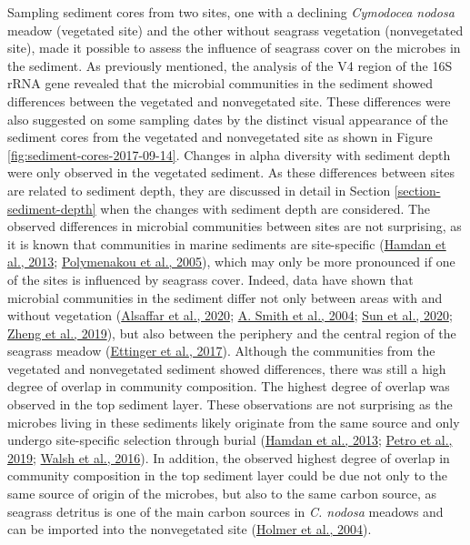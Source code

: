 \documentclass[
  12 pt,
]{book}
\begin{document}
Sampling sediment cores from two sites, one with a declining \emph{Cymodocea nodosa} meadow (vegetated site) and the other without seagrass vegetation (nonvegetated site), made it possible to assess the influence of seagrass cover on the microbes in the sediment. As previously mentioned, the analysis of the V4 region of the 16S rRNA gene revealed that the microbial communities in the sediment showed differences between the vegetated and nonvegetated site. These differences were also suggested on some sampling dates by the distinct visual appearance of the sediment cores from the vegetated and nonvegetated site as shown in Figure \ref{fig:sediment-cores-2017-09-14}. Changes in alpha diversity with sediment depth were only observed in the vegetated sediment. As these differences between sites are related to sediment depth, they are discussed in detail in Section \ref{section-sediment-depth} when the changes with sediment depth are considered. The observed differences in microbial communities between sites are not surprising, as it is known that communities in marine sediments are site-specific (\protect\hyperlink{ref-Hamdan2013}{Hamdan et al., 2013}; \protect\hyperlink{ref-Polymenakou2005}{Polymenakou et al., 2005}), which may only be more pronounced if one of the sites is influenced by seagrass cover. Indeed, data have shown that microbial communities in the sediment differ not only between areas with and without vegetation (\protect\hyperlink{ref-Alsaffar2020}{Alsaffar et al., 2020}; \protect\hyperlink{ref-Smith2004}{A. Smith et al., 2004}; \protect\hyperlink{ref-Sun2020}{Sun et al., 2020}; \protect\hyperlink{ref-Zheng2019}{Zheng et al., 2019}), but also between the periphery and the central region of the seagrass meadow (\protect\hyperlink{ref-Ettinger2017}{Ettinger et al., 2017}). Although the communities from the vegetated and nonvegetated sediment showed differences, there was still a high degree of overlap in community composition. The highest degree of overlap was observed in the top sediment layer. These observations are not surprising as the microbes living in these sediments likely originate from the same source and only undergo site-specific selection through burial (\protect\hyperlink{ref-Hamdan2013}{Hamdan et al., 2013}; \protect\hyperlink{ref-Petro2019}{Petro et al., 2019}; \protect\hyperlink{ref-Walsh2016a}{Walsh et al., 2016}). In addition, the observed highest degree of overlap in community composition in the top sediment layer could be due not only to the same source of origin of the microbes, but also to the same carbon source, as seagrass detritus is one of the main carbon sources in \emph{C. nodosa} meadows and can be imported into the nonvegetated site (\protect\hyperlink{ref-Holmer2004}{Holmer et al., 2004}).
\end{document}
